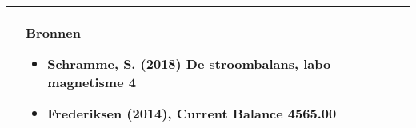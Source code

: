 \begin{landscape}
\begin{tabularx}{1.56\textwidth}{|p{}|X|}
		\\ \cline{2-2}
		  & \textbf{Bronnen}\begin{itemize}
		  	\item Schramme, S. (2018) De stroombalans, labo magnetisme 4
		  	\item Frederiksen (2014), Current Balance 4565.00
		  \end{itemize}\\ \hline
	\end{tabularx}


\newpage
	

\end{landscape}

